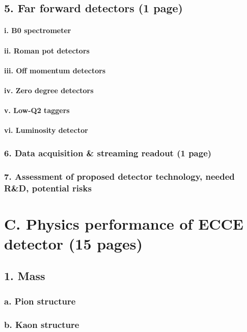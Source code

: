 \documentclass{report}
\begin{document}
\subsection{5. Far forward detectors (1 page)}
\paragraph{i. B0 spectrometer}
\paragraph{ii. Roman pot detectors}
\paragraph{iii. Off momentum detectors}
\paragraph{iv. Zero degree detectors}
\paragraph{v. Low-Q2 taggers}
\paragraph{vi. Luminosity detector}
\subsubsection{6. Data acquisition & streaming readout (1 page)}
\subsubsection{7. Assessment of proposed detector technology, needed R&D, potential risks}
%
\section{C. Physics performance of ECCE detector (15 pages)}
\subsection{1. Mass}
\subsubsection{a. Pion structure}
\subsubsection{b. Kaon structure}
\end{document}
